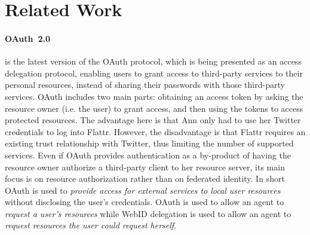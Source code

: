 \documentclass[a4paper]{llncs}
\begin{document}
\section{Related Work}\label{sec:relatedwork}

\paragraph{OAuth~2.0}\cite{hardt-d-2012--a} is the latest version of the OAuth protocol, which is being presented as an access delegation protocol, enabling users to grant access to third-party services to their personal resources, instead of sharing their passwords with those third-party services.
OAuth includes two main parts: obtaining an access token by asking the resource owner (i.e. the user) to grant access, and then using the tokens to access protected resources. 
The advantage here is that Ann only had to use her Twitter credentials to log into Flattr.  However, the disadvantage is that Flattr requires an existing trust relationship with Twitter, thus limiting the number of supported services.
Even if OAuth provides authentication as a by-product of having the resource owner authorize a third-party client to her resource server, its main focus is on resource authorization rather than on federated identity.
In short OAuth is used to \textit{provide access for external services to local user resources} without disclosing the user's credentials.
OAuth is used to allow an agent to \textit{request a user's resources} while WebID delegation is used to allow an agent to \textit{request resources the user could request herself}.
\end{document}
